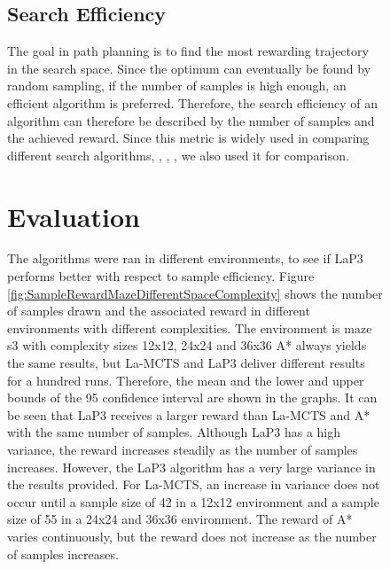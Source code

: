 \documentclass[bibliography=totoc]{scrartcl}
\begin{document}
\begin{figure}[H]
\subsection{Search Efficiency}
The goal in path planning is to find the most rewarding trajectory in the search space.
Since the optimum can eventually be found by random sampling, if the number of samples is high enough, an efficient algorithm is preferred.
Therefore, the search efficiency of an algorithm can therefore be described by the number of samples and the achieved reward.
Since this metric is widely used in comparing different search algorithms, \cite{La-MCTS}, \cite{LaNAS}, \cite{VOOT}, we also used it for comparison.
\section{Evaluation}


The algorithms were ran in different environments, to see if \ac{LaP3} performs better with respect to sample efficiency.
Figure \ref{fig:SampleRewardMazeDifferentSpaceComplexity} shows the number of samples drawn and the associated reward in different environments with different complexities.
The environment is maze s3 with complexity sizes 12x12, 24x24 and 36x36
A* always yields the same results, but \ac{La-MCTS} and \ac{LaP3} deliver different results for a hundred runs. 
Therefore, the mean and the lower and upper bounds of the 95 confidence interval are shown in the graphs.
It can be seen that \ac{LaP3} receives a larger reward than \ac{La-MCTS} and A* with the same number of samples.
Although \ac{LaP3} has a high variance, the reward increases steadily as the number of samples increases.
However, the \ac{LaP3} algorithm has a very large variance in the results provided.
For \ac{La-MCTS}, an increase in variance does not occur until a sample size of 42 in a 12x12 environment and a sample size of 55 in a 24x24 and 36x36 environment.
The reward of A* varies continuously, but the reward does not increase as the number of samples increases.


\end{figure}
\end{document}
